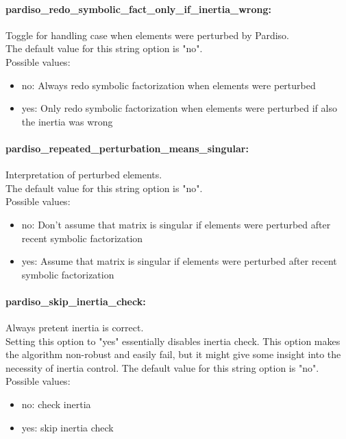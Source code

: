 \paragraph{pardiso\_redo\_symbolic\_fact\_only\_if\_inertia\_wrong:}\label{sec:pardiso_redo_symbolic_fact_only_if_inertia_wrong} Toggle for handling case when elements were perturbed by Pardiso. $\;$ \\
The default value for this string option is "no".
\\ 
Possible values:
\begin{itemize}
   \item no: Always redo symbolic factorization when
elements were perturbed
   \item yes: Only redo symbolic factorization when elements
were perturbed if also the inertia was wrong
\end{itemize}

\paragraph{pardiso\_repeated\_perturbation\_means\_singular:}\label{sec:pardiso_repeated_perturbation_means_singular} Interpretation of perturbed elements. $\;$ \\
The default value for this string option is "no".
\\ 
Possible values:
\begin{itemize}
   \item no: Don't assume that matrix is singular if
elements were perturbed after recent symbolic
factorization
   \item yes: Assume that matrix is singular if elements were
perturbed after recent symbolic factorization
\end{itemize}

\paragraph{pardiso\_skip\_inertia\_check:}\label{sec:pardiso_skip_inertia_check} Always pretent inertia is correct. $\;$ \\
 Setting this option to "yes" essentially disables
inertia check. This option makes the algorithm
non-robust and easily fail, but it might give
some insight into the necessity of inertia
control.
The default value for this string option is "no".
\\ 
Possible values:
\begin{itemize}
   \item no: check inertia
   \item yes: skip inertia check
\end{itemize}

